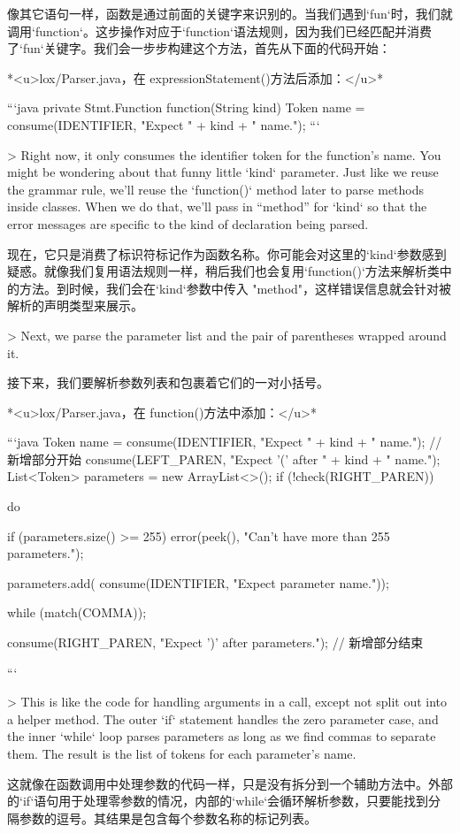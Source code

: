 \documentclass[cn,11pt,chinese]{elegantbook}
\begin{document}
{{{{{像其它语句一样，函数是通过前面的关键字来识别的。当我们遇到`fun`时，我们就调用`function`。这步操作对应于`function`语法规则，因为我们已经匹配并消费了`fun`关键字。我们会一步步构建这个方法，首先从下面的代码开始：

*<u>lox/Parser.java，在 expressionStatement()方法后添加：</u>*

```java
  private Stmt.Function function(String kind) {
    Token name = consume(IDENTIFIER, "Expect " + kind + " name.");
  }
```

> Right now, it only consumes the identifier token for the function’s name. You might be wondering about that funny little `kind` parameter. Just like we reuse the grammar rule, we’ll reuse the `function()` method later to parse methods inside classes. When we do that, we’ll pass in “method” for `kind` so that the error messages are specific to the kind of declaration being parsed.

现在，它只是消费了标识符标记作为函数名称。你可能会对这里的`kind`参数感到疑惑。就像我们复用语法规则一样，稍后我们也会复用`function()`方法来解析类中的方法。到时候，我们会在`kind`参数中传入 "method"，这样错误信息就会针对被解析的声明类型来展示。

> Next, we parse the parameter list and the pair of parentheses wrapped around it.

接下来，我们要解析参数列表和包裹着它们的一对小括号。

*<u>lox/Parser.java，在 function()方法中添加：</u>*

```java
    Token name = consume(IDENTIFIER, "Expect " + kind + " name.");
    // 新增部分开始
    consume(LEFT_PAREN, "Expect '(' after " + kind + " name.");
    List<Token> parameters = new ArrayList<>();
    if (!check(RIGHT_PAREN)) {
      do {
        if (parameters.size() >= 255) {
          error(peek(), "Can't have more than 255 parameters.");
        }

        parameters.add(
            consume(IDENTIFIER, "Expect parameter name."));
      } while (match(COMMA));
    }
    consume(RIGHT_PAREN, "Expect ')' after parameters.");
    // 新增部分结束
  }
```

> This is like the code for handling arguments in a call, except not split out into a helper method. The outer `if` statement handles the zero parameter case, and the inner `while` loop parses parameters as long as we find commas to separate them. The result is the list of tokens for each parameter’s name.

这就像在函数调用中处理参数的代码一样，只是没有拆分到一个辅助方法中。外部的`if`语句用于处理零参数的情况，内部的`while`会循环解析参数，只要能找到分隔参数的逗号。其结果是包含每个参数名称的标记列表。

}}}}
\end{document}
